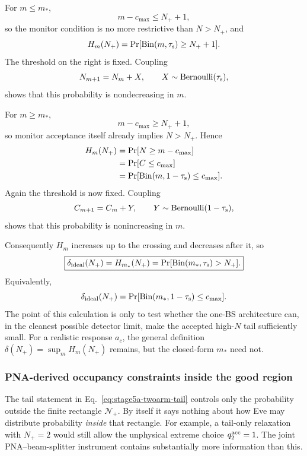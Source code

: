 \documentclass[11pt]{article}
\theoremstyle{remark}
\begin{document}
For \(m\le m_*\),
\[
    m-c_{\max}\le N_++1,
\]
so the monitor condition is no more restrictive than \(N>N_+\), and
\begin{equation}
    H_m(N_+)
    =
    \Pr[
      \operatorname{Bin}(m,\tau_{\rm s})
      \ge N_++1
    ].
    \label{eq:stage5a-H-left}
\end{equation}
The threshold on the right is fixed.  Coupling
\[
    N_{m+1}=N_m+X,
    \qquad
    X\sim\operatorname{Bernoulli}(\tau_{\rm s}),
\]
shows that this probability is nondecreasing in \(m\).

For \(m\ge m_*\),
\[
    m-c_{\max}\ge N_++1,
\]
so monitor acceptance itself already implies \(N>N_+\).  Hence
\begin{align}
    H_m(N_+)
    &=
    \Pr[
      N\ge m-c_{\max}
    ]
    \nonumber\\
    &=
    \Pr[
      C\le c_{\max}
    ]
    \nonumber\\
    &=
    \Pr[
      \operatorname{Bin}(m,1-\tau_{\rm s})
      \le c_{\max}
    ].
    \label{eq:stage5a-H-right}
\end{align}
Again the threshold is now fixed.  Coupling
\[
    C_{m+1}=C_m+Y,
    \qquad
    Y\sim\operatorname{Bernoulli}(1-\tau_{\rm s}),
\]
shows that this probability is nonincreasing in \(m\).

Consequently \(H_m\) increases up to the crossing and decreases after it, so
\begin{equation}
    \boxed{
    \delta_{\rm ideal}(N_+)
    =
    H_{m_*}(N_+)
    =
    \Pr[
      \operatorname{Bin}(m_*,\tau_{\rm s})>N_+
    ].
    }
    \label{eq:stage5a-ideal-delta}
\end{equation}
Equivalently,
\[
    \delta_{\rm ideal}(N_+)
    =
    \Pr[
      \operatorname{Bin}(m_*,1-\tau_{\rm s})
      \le c_{\max}
    ].
\]
The point of this calculation is only to test whether the one-BS architecture
can, in the cleanest possible detector limit, make the accepted high-\(N\)
tail sufficiently small.  For a realistic response \(a_c\), the general
definition \(\delta(N_+)=\sup_mH_m(N_+)\) remains, but the closed-form
\(m_*\) need not.

\subsubsection{PNA-derived occupancy constraints inside the good region}
\label{sec:stage5a-occupancy}

The tail statement in Eq.~\eqref{eq:stage5a-twoarm-tail} controls only the
probability outside the finite rectangle \(\mathcal N_+\).  By itself it says
nothing about how Eve may distribute probability \emph{inside} that rectangle.
For example, a tail-only relaxation with \(N_+=2\) would still allow the
unphysical extreme choice \(q_2^{\rm acc}=1\).  The joint PNA--beam-splitter
instrument contains substantially more information than this.
\end{document}
